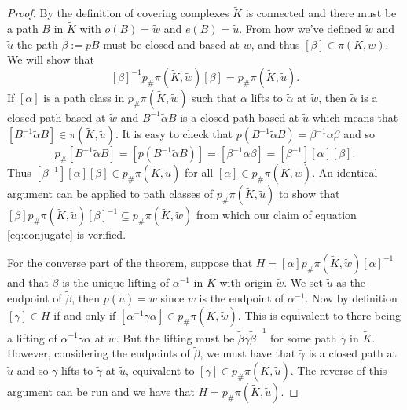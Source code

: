 \begin{proof}
  By the definition of covering complexes $\tilde{K}$ is connected and there must be a path $B$ in $\tilde{K}$ with $o(B) = \tilde{w}$ and $e(B) = \tilde{u}$. From how we've defined $\tilde{w}$ and $\tilde{u}$ the path $\beta:=pB$ must be closed and based at $w$, and thus $[\beta] \in \pi(K,w)$. We will show that
  \begin{equation}
    \label{eq:conjugate}
    [\beta]^{-1} p_{\#}\pi(\tilde{K},\tilde{w}) [\beta] = p_{\#}\pi(\tilde{K},\tilde{u}).
  \end{equation}
  If $[\alpha]$ is a path class in $p_{\#}\pi(\tilde{K},\tilde{w})$ such that $\alpha$ lifts to $\tilde{\alpha}$ at $\tilde{w}$, then $\tilde{\alpha}$ is a closed path based at $\tilde{w}$ and $B^{-1} \tilde{\alpha} B$ is a closed path based at $\tilde{u}$ which means that $[B^{-1} \tilde{\alpha} B] \in \pi(\tilde{K},\tilde{u})$. It is easy to check that $p(B^{-1} \tilde{\alpha} B) = \beta^{-1}\alpha\beta$ and so
  \begin{equation*}
    p_{\#}[B^{-1} \tilde{\alpha} B] = [p(B^{-1} \tilde{\alpha} B)] = [\beta^{-1}\alpha\beta] = [\beta^{-1}][\alpha][\beta].
  \end{equation*}
  Thus $[\beta^{-1}][\alpha][\beta] \in p_{\#}\pi(\tilde{K},\tilde{u})$ for all $[\alpha] \in p_{\#}\pi(\tilde{K},\tilde{w})$. An identical argument can be applied to path classes of $p_{\#}\pi(\tilde{K},\tilde{u})$ to show that $[\beta] p_{\#}\pi(\tilde{K},\tilde{u}) [\beta]^{-1} \subseteq p_{\#}\pi(\tilde{K},\tilde{w})$ from which our claim of equation \ref{eq:conjugate} is verified.

  For the converse part of the theorem, suppose that $H = [\alpha]p_{\#}\pi(\tilde{K},\tilde{w})[\alpha]^{-1}$ and that $\tilde{\beta}$ is  the unique lifting of $\alpha^{-1}$ in $\tilde{K}$ with origin $\tilde{w}$. We set $\tilde{u}$ as the endpoint of $\tilde{\beta}$, then $p(\tilde{u}) = w$ since $w$ is the endpoint of $\alpha^{-1}$. Now by definition $[\gamma] \in H$ if and only if $[\alpha^{-1}\gamma\alpha] \in p_{\#}\pi(\tilde{K},\tilde{w})$. This is equivalent to there being a lifting of $\alpha^{-1} \gamma \alpha$ at $\tilde{w}$. But the lifting must be $\tilde{\beta} \tilde{\gamma} \tilde{\beta}^{-1}$ for some path $\tilde{\gamma}$ in $\tilde{K}$. However, considering the endpoints of $\tilde{\beta}$, we must have that $\tilde{\gamma}$ is a closed path at $\tilde{u}$ and so $\gamma$ lifts to $\tilde{\gamma}$ at $\tilde{u}$, equivalent to $[\gamma] \in p_{\#}\pi(\tilde{K},\tilde{u})$. The reverse of this argument can be run and we have that $H = p_{\#}\pi(\tilde{K},\tilde{u})$.
\end{proof}

